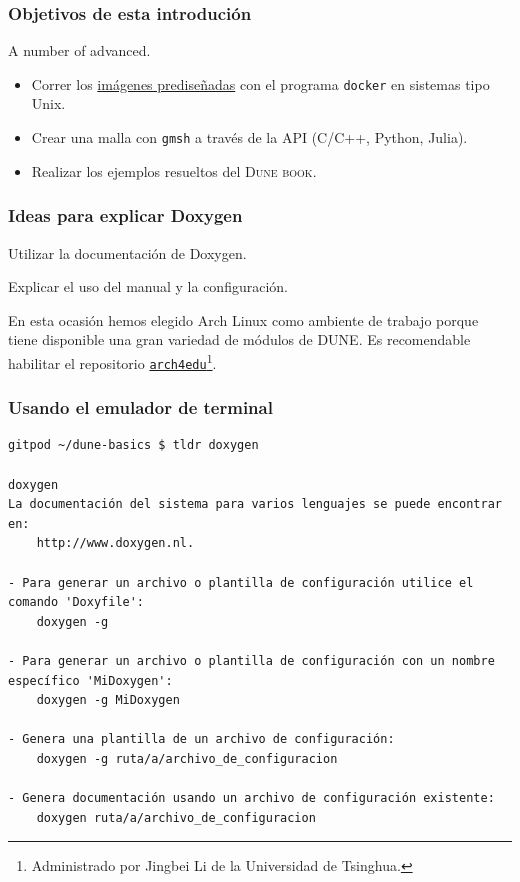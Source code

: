 




\begin{frame}
	\frametitle{Objetivos de esta introdución}
	A number of advanced.
	\begin{itemize}
		\item Correr los \href{https://github.com/orgs/cpp-review-dune/packages}{imágenes prediseñadas} con el programa \lstinline{docker} en sistemas tipo Unix.
		\item Crear una malla con \lstinline{gmsh} a través de la API (C/C++, Python, Julia).
		\item Realizar los ejemplos resueltos del \textsc{Dune book}.
	\end{itemize}
\end{frame}

\begin{frame}
	\frametitle{Ideas para explicar Doxygen}
	\begin{description}
	\item Utilizar la documentación de Doxygen.
	\item Explicar el uso del manual y la configuración.
	\end{description}
\end{frame}

\begin{frame}
	En esta ocasión hemos elegido Arch Linux como ambiente de trabajo porque tiene disponible una gran variedad de módulos de DUNE.
	Es recomendable habilitar el repositorio \href{https://wiki.archlinux.org/title/Unofficial\_user\_repositories\#arch4edu}{\texttt{arch4edu}}\footnote{Administrado por Jingbei Li de la Universidad de Tsinghua.}.
\end{frame}

\begin{frame}
	\frametitle{Usando el emulador de terminal}
\end{frame}

\begin{frame}[fragile]\LARGE
\begin{lstlisting}
gitpod ~/dune-basics $ tldr doxygen

doxygen
La documentación del sistema para varios lenguajes se puede encontrar en: 
	http://www.doxygen.nl.

- Para generar un archivo o plantilla de configuración utilice el comando 'Doxyfile':
	doxygen -g

- Para generar un archivo o plantilla de configuración con un nombre específico 'MiDoxygen':
	doxygen -g MiDoxygen

- Genera una plantilla de un archivo de configuración:
	doxygen -g ruta/a/archivo_de_configuracion

- Genera documentación usando un archivo de configuración existente:
	doxygen ruta/a/archivo_de_configuracion
\end{lstlisting}
\end{frame}

